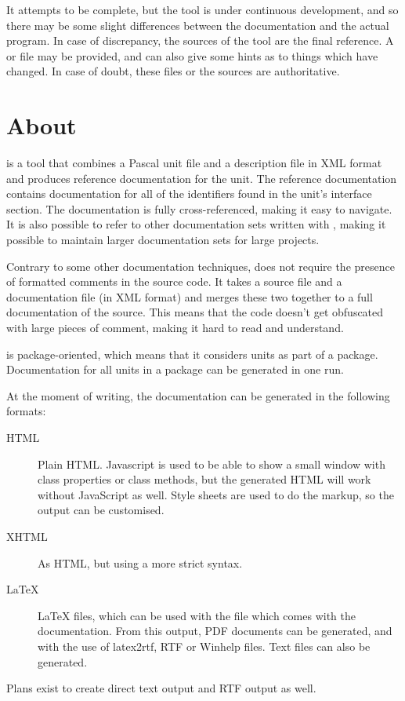 It attempts to be complete, but the tool is under continuous development,
and so there may be some slight differences between the documentation and
the actual program. In case of discrepancy, the sources of the tool are the
final reference. A  or  file may be provided, and
can also give some hints as to things which have changed. In case of doubt,
these files or the sources are authoritative.

\section{About \fpdoc}
\fpdoc is a tool that combines a Pascal unit file and a description file
in XML format and produces reference documentation for the unit. The
reference documentation contains documentation for all of the identifiers
found in the unit's interface section. The documentation is fully
cross-referenced, making it easy to navigate. It is also possible to refer
to other documentation sets written with \fpdoc, making it possible to
maintain larger documentation sets for large projects.

Contrary to some other documentation techniques, \fpdoc does not require the
presence of formatted comments in the source code. It takes a source file
and a documentation file (in XML format) and merges these two together to a
full documentation of the source. This means that the code doesn't get
obfuscated with large pieces of comment, making it hard to read and
understand. 

\fpdoc is package-oriented, which means that it considers units as part of a
package. Documentation for all units in a package can be generated in one
run.

At the moment of writing, the documentation can be generated in the
following formats:
\begin{description}
\item[HTML] Plain HTML. Javascript is used to be able to show a small window
with class properties or class methods, but the generated HTML will work
without JavaScript as well. Style sheets are used to do the markup, so the
output can be customised.
\item[XHTML] As HTML, but using a more strict syntax.
\item[LaTeX] LaTeX files, which can be used with the  file
which comes with the \fpc documentation. From this output, PDF documents can
be generated, and with the use of latex2rtf, RTF or Winhelp files. Text
files can also be generated.
\end{description}
Plans exist to create direct text output and RTF output as well.

